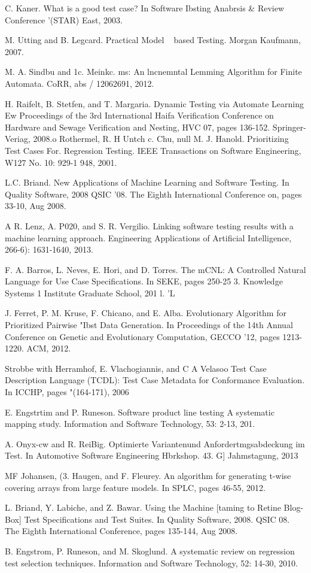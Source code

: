 \documentclass{article}
\begin{document}
\begin{thebibliography}{9}
C. Kaner. What is a good test case? In Software Ibsting Anabrsis & Review Conference '(STAR) East, 2003.

M. Utting and B. Legcard. Practical Model ~ based Testing. Morgan Kaufmann, 2007.

M. A. Sindbu and 1c. Meinkc. ms: An lncnemntal Lemming Algorithm for Finite Automata. CoRR, abs / 12062691, 2012.

H. Raifelt, B. Stetfen, and T. Margaria. Dynamic Testing via Automate Learning Ew Proceedings of the 3rd International Haifa Verification Conference on Hardware and Sewage Verification and Nesting, HVC 07, pages 136-152. Springer-Veriag, 2008.o Rothermel, R. H Untch c. Chu, null M. J. Hanold. Prioritizing Test Cases For. Regression Testing. IEEE Transactions on Software Engineering, W127 No. 10: 929-1 948, 2001.

L.C. Briand. New Applications of Machine Learning and Software Testing. In Quality Software, 2008 QSIC '08. The Eighth International Conference on, pages 33-10, Aug 2008.

A R. Lenz, A. P020, and S. R. Vergilio. Linking software testing results with a machine learning approach. Engineering Applications of Artificial Intelligence, 266-6): 1631-1640, 2013.

F. A. Barros, L. Neves, E. Hori, and D. Torres. The mCNL: A Controlled Natural Language for Use Case Specifications. In SEKE, pages 250-25 3. Knowledge Systems 1 Institute Graduate School, 201 l. 'L

J. Ferret, P. M. Kruse, F. Chicano, and E. Alba. Evolutionary Algorithm for Prioritized Pairwise "Ibst Data Generation. In Proceedings of the 14th Annual Conference on Genetic and Evolutionary Computation, GECCO '12, pages 1213-1220. ACM, 2012.

Strobbe with Herramhof, E. Vlachogiannis, and C A Velasoo Test Case Description Language (TCDL): Test Case Metadata for Conformance Evaluation. In ICCHP, pages "(164-171), 2006

E. Engstrtim and P. Runeson. Software product line testing A systematic mapping study. Information and Software Technology, 53: 2-13, 201.

A. Onyx-cw and R. ReiBig. Optimierte Variantenund Anfordertmgsabdeckung im Test. In Automotive Software Engineering Hbrkshop. 43. G] Jahmstagung, 2013

MF Johansen, (3. Haugen, and F. Fleurey. An algorithm for generating t-wise covering arrays from large feature models. In SPLC, pages 46-55, 2012.

L. Briand, Y. Labiche, and Z. Bawar. Using the Machine [taming to Retine Blog-Box] Test Specifications and Test Suites. In Quality Software, 2008. QSIC 08. The Eighth International Conference, pages 135-144, Aug 2008. 

B. Engstrom, P. Runeson, and M. Skoglund. A systematic review on regression test selection techniques. Information and Software Technology, 52: 14-30, 2010.

\end{thebibliography}
\end{document}
